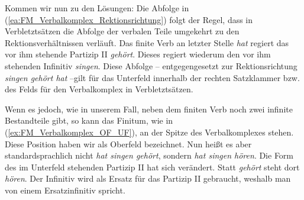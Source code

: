 \largerpage
Kommen wir nun zu den Lösungen: Die Abfolge in (\ref{ea:FM_Verbalkomplex_Rektionsrichtung}) folgt der Regel, dass in Verbletztsätzen die Abfolge der verbalen Teile umgekehrt zu den Rektionsverhältnissen verläuft. Das finite Verb an letzter Stelle \textit{hat} regiert das vor ihm stehende Partizip II \textit{gehört}. Dieses regiert wiederum den vor ihm stehenden Infinitiv \textit{singen}. Diese Abfolge -- entgegengesetzt zur Rektionsrichtung \textit{singen gehört hat} --gilt für das Unterfeld innerhalb der rechten Satzklammer bzw. des Felds für den Verbalkomplex in Verbletztsätzen.

Wenn es jedoch, wie in unserem Fall, neben dem finiten Verb noch zwei infinite Bestandteile gibt, so kann das Finitum, wie in (\ref{ex:FM_Verbalkomplex_OF_UF}), an der Spitze des Verbalkomplexes stehen. Diese Position haben wir als Oberfeld bezeichnet. Nun heißt es aber standardsprachlich nicht \textit{hat singen gehört}, sondern \textit{hat singen hören}. Die Form des im Unterfeld stehenden Partizip II hat sich verändert. Statt \textit{gehört} steht dort \textit{hören}. Der Infinitiv wird als Ersatz für das Partizip II gebraucht, weshalb man von einem Ersatzinfinitiv spricht.    

